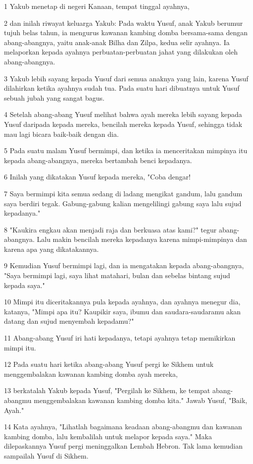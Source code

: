 \par 1 Yakub menetap di negeri Kanaan, tempat tinggal ayahnya,
\par 2 dan inilah riwayat keluarga Yakub: Pada waktu Yusuf, anak Yakub berumur tujuh belas tahun, ia mengurus kawanan kambing domba bersama-sama dengan abang-abangnya, yaitu anak-anak Bilha dan Zilpa, kedua selir ayahnya. Ia melaporkan kepada ayahnya perbuatan-perbuatan jahat yang dilakukan oleh abang-abangnya.
\par 3 Yakub lebih sayang kepada Yusuf dari semua anaknya yang lain, karena Yusuf dilahirkan ketika ayahnya sudah tua. Pada suatu hari dibuatnya untuk Yusuf sebuah jubah yang sangat bagus.
\par 4 Setelah abang-abang Yusuf melihat bahwa ayah mereka lebih sayang kepada Yusuf daripada kepada mereka, bencilah mereka kepada Yusuf, sehingga tidak mau lagi bicara baik-baik dengan dia.
\par 5 Pada suatu malam Yusuf bermimpi, dan ketika ia menceritakan mimpinya itu kepada abang-abangnya, mereka bertambah benci kepadanya.
\par 6 Inilah yang dikatakan Yusuf kepada mereka, "Coba dengar!
\par 7 Saya bermimpi kita semua sedang di ladang mengikat gandum, lalu gandum saya berdiri tegak. Gabung-gabung kalian mengelilingi gabung saya lalu sujud kepadanya."
\par 8 "Kaukira engkau akan menjadi raja dan berkuasa atas kami?" tegur abang-abangnya. Lalu makin bencilah mereka kepadanya karena mimpi-mimpinya dan karena apa yang dikatakannya.
\par 9 Kemudian Yusuf bermimpi lagi, dan ia mengatakan kepada abang-abangnya, "Saya bermimpi lagi, saya lihat matahari, bulan dan sebelas bintang sujud kepada saya."
\par 10 Mimpi itu diceritakannya pula kepada ayahnya, dan ayahnya menegur dia, katanya, "Mimpi apa itu? Kaupikir saya, ibumu dan saudara-saudaramu akan datang dan sujud menyembah kepadamu?"
\par 11 Abang-abang Yusuf iri hati kepadanya, tetapi ayahnya tetap memikirkan mimpi itu.
\par 12 Pada suatu hari ketika abang-abang Yusuf pergi ke Sikhem untuk menggembalakan kawanan kambing domba ayah mereka,
\par 13 berkatalah Yakub kepada Yusuf, "Pergilah ke Sikhem, ke tempat abang-abangmu menggembalakan kawanan kambing domba kita." Jawab Yusuf, "Baik, Ayah."
\par 14 Kata ayahnya, "Lihatlah bagaimana keadaan abang-abangmu dan kawanan kambing domba, lalu kembalilah untuk melapor kepada saya." Maka dilepaskannya Yusuf pergi meninggalkan Lembah Hebron. Tak lama kemudian sampailah Yusuf di Sikhem.
